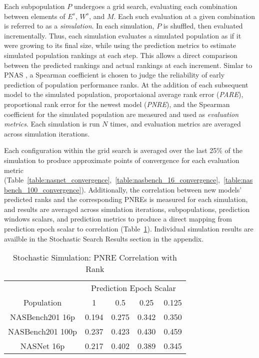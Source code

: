 \documentclass[twocolumn]{article}
\begin{document}
Each subpopulation $P$ undergoes a grid search, evaluating each combination between elements of $E^s$, $W^s$, and $M$.
Each such evaluation at a given combination is referred to as a \emph{simulation}.
In each simulation, $P$ is shuffled, then evaluated incrementally.
Thus, each simulation evaluates a simulated population as if it were growing to its final size, while using
the prediction metrics to estimate simulated population rankings at each step.
This allows a direct comparison between the predicted rankings and actual rankings at each increment.
Simlar to PNAS \cite{pnas}, a Spearman coefficient is chosen to judge the reliability of early prediction of population performance ranks.
At the addition of each subsequent model to the simulated population, proportaional average rank error (\emph{PARE}), proportional rank error for the newest model (\emph{PNRE}), and the Spearman coefficient
for the simulated population are measured and used as \emph{evaluation metrics}.
Each simulation is run $N$ times, and evaluation metrics are averaged across simulation iterations. 

Each configuration within the grid search is averaged over the last 25\% of the simulation to produce approximate points of convergence for each evaluation metric 
(Table~\ref{table:nasnet_convergence},~\ref{table:nasbench_16_convergence},~\ref{table:nasbench_100_convergence}).
Additionally, the correlation between new models' predicted ranks and the corresponding PNREs is measured for each simulation,
and results are averaged across simulation iterations, subpopulations, prediction windows scalars, and prediction metrics to produce a direct mapping from prediction epoch scalar to correlation (Table~\ref{table:rank_error_corr}).
Individual simulation results are availble in the Stochastic Search Results section in the appendix.

\begin{table}[!h]
    \begin{center}
        \begin{tabular}{c | c | c | c | c}
            \toprule
            & \multicolumn{4}{c}{Prediction Epoch Scalar} \\
            Population          & 1    & 0.5    & 0.25  & 0.125 \\
            \midrule
            NASBench201 16p     & 0.194 & 0.275 & 0.342 & 0.350 \\
            NASBench201 100p    & 0.237 & 0.423 & 0.430 & 0.459 \\
            NASNet 16p          & 0.217 & 0.402 & 0.389 & 0.345 \\
            \bottomrule
        \end{tabular}
        \caption{Stochastic Simulation: PNRE Correlation with Rank}
        \label{table:rank_error_corr}
    \end{center}
\end{table}
\end{document}

